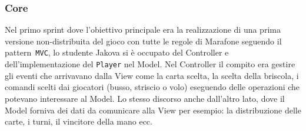  \subsubsection{Core}\label{subsub:jakova:core}
    Nel primo sprint dove l’obiettivo principale era la realizzazione di una prima versione non-distribuita del gioco con tutte le regole di Marafone seguendo il pattern\texttt{ MVC}, lo studente Jakova si è occupato del Controller e dell’implementazione del \texttt{Player} nel Model. Nel Controller il compito era gestire gli eventi che arrivavano dalla View come la carta scelta, la scelta della briscola, i comandi scelti dai giocatori (busso, striscio o volo) eseguendo delle operazioni che potevano interessare al Model. Lo stesso discorso anche dall’altro lato, dove il Model forniva dei dati da comunicare alla View per esempio: la distribuzione delle carte, i turni, il vincitore della mano ecc. 

